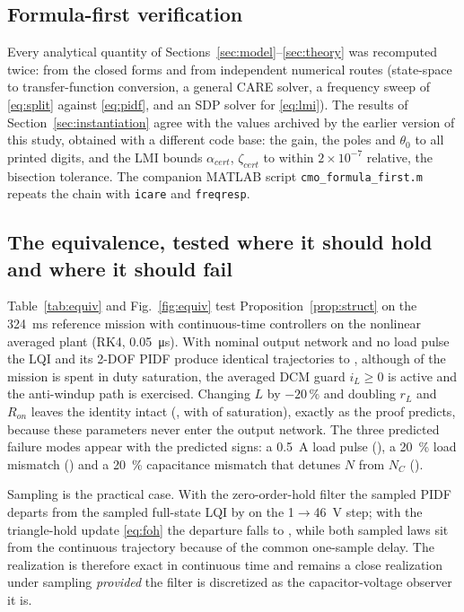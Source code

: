 \subsection{Formula-first verification}\label{sec:res:ff}
Every analytical quantity of Sections~\ref{sec:model}--\ref{sec:theory} was
recomputed twice: from the closed forms and from independent numerical routes
(state-space to transfer-function conversion, a general CARE solver, a
frequency sweep of \eqref{eq:split} against \eqref{eq:pidf}, and an SDP solver
for \eqref{eq:lmi}). The results of Section~\ref{sec:instantiation} agree with
the values archived by the earlier version of this study, obtained with a
different code base: the gain, the poles and $\theta_0$ to all printed digits,
and the LMI bounds $\alpha_{cert}$, $\zeta_{cert}$ to within $2\times10^{-7}$
relative, the bisection tolerance. The companion MATLAB script
\texttt{cmo\_formula\_first.m} repeats the chain with \texttt{icare} and
\texttt{freqresp}.

\subsection{The equivalence, tested where it should hold and where it should fail}\label{sec:res:equiv}
Table~\ref{tab:equiv} and Fig.~\ref{fig:equiv} test Proposition~\ref{prop:struct}
on the \SI{324}{ms} reference mission with continuous-time controllers on the
nonlinear averaged plant (RK4, \SI{0.05}{\micro s}). With nominal output network
and no load pulse the LQI and its 2-DOF PIDF produce identical trajectories to
\EqNom{}, although \EqNomSat{} of the mission is spent in duty saturation, the
averaged DCM guard $i_L\ge0$ is active and the anti-windup path is exercised.
Changing $L$ by $-20\,\%$ and doubling $r_L$ and $R_{on}$ leaves the identity
intact (\EqL{}, with \EqLSat{} of saturation), exactly as the proof predicts,
because these parameters never enter the output network. The three predicted
failure modes appear with the predicted signs: a \SI{0.5}{A} load pulse
(\EqLoad{}), a \SI{+20}{\percent} load mismatch (\EqR{}) and a
\SI{+20}{\percent} capacitance mismatch that detunes $N$ from $N_C$ (\EqC{}).

Sampling is the practical case. With the zero-order-hold filter the sampled
PIDF departs from the sampled full-state LQI by \EqSampZOH{} on the
1$\to$46~V step; with the triangle-hold update \eqref{eq:foh} the departure
falls to \EqSampFOH{}, while both sampled laws sit \EqSampDelay{} from the
continuous trajectory because of the common one-sample delay. The realization is
therefore exact in continuous time and remains a close realization under
sampling \emph{provided} the filter is discretized as the capacitor-voltage
observer it is.

